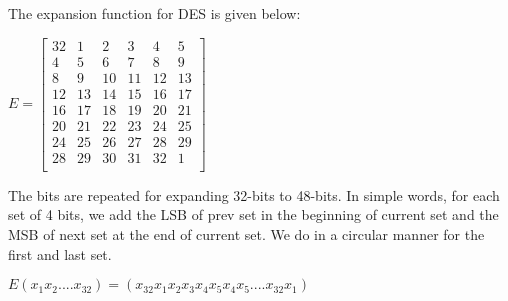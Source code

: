 \documentclass[11pt]{article}
\begin{document}
The expansion function for DES is given below:
\begin{center}
    $ E = 
    \begin{bmatrix}
        32 & 1 & 2 & 3 & 4 & 5\\
        4 & 5 & 6 & 7 & 8 & 9\\
        8 & 9 & 10 & 11 & 12 & 13\\
        12 & 13 & 14 & 15 & 16 & 17\\
        16 & 17 & 18 & 19 & 20 & 21\\
        20 & 21 & 22 & 23 & 24 & 25\\
        24 & 25 & 26 & 27 & 28 & 29\\
        28 & 29 & 30 & 31 & 32 & 1\\
    \end{bmatrix}$
\end{center}
The bits are repeated for expanding 32-bits to 48-bits.
In simple words, for each set of 4 bits, we add the LSB of prev set in the beginning of current set and the MSB of next set at the end of current set. We do in a circular manner for the first and last set.
\begin{center}
    $E(x_1x_2....x_{32}) = (x_{32}x_1x_2x_3x_4x_5x_4x_5....x_{32}x_1)$
\end{center}
\end{document}
